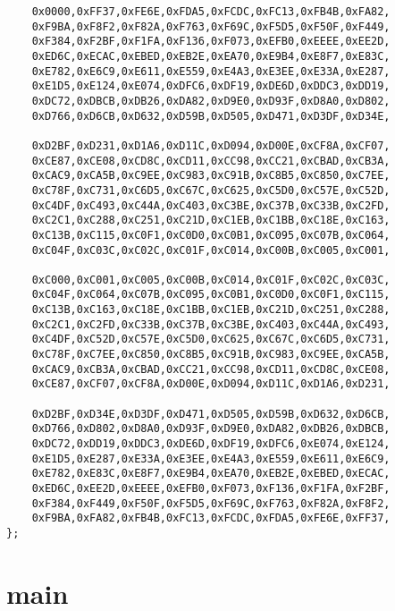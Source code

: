 \begin{lstlisting}
	0x0000,0xFF37,0xFE6E,0xFDA5,0xFCDC,0xFC13,0xFB4B,0xFA82,
	0xF9BA,0xF8F2,0xF82A,0xF763,0xF69C,0xF5D5,0xF50F,0xF449,
	0xF384,0xF2BF,0xF1FA,0xF136,0xF073,0xEFB0,0xEEEE,0xEE2D,
	0xED6C,0xECAC,0xEBED,0xEB2E,0xEA70,0xE9B4,0xE8F7,0xE83C,
	0xE782,0xE6C9,0xE611,0xE559,0xE4A3,0xE3EE,0xE33A,0xE287,
	0xE1D5,0xE124,0xE074,0xDFC6,0xDF19,0xDE6D,0xDDC3,0xDD19,
	0xDC72,0xDBCB,0xDB26,0xDA82,0xD9E0,0xD93F,0xD8A0,0xD802,
	0xD766,0xD6CB,0xD632,0xD59B,0xD505,0xD471,0xD3DF,0xD34E,

	0xD2BF,0xD231,0xD1A6,0xD11C,0xD094,0xD00E,0xCF8A,0xCF07,
	0xCE87,0xCE08,0xCD8C,0xCD11,0xCC98,0xCC21,0xCBAD,0xCB3A,
	0xCAC9,0xCA5B,0xC9EE,0xC983,0xC91B,0xC8B5,0xC850,0xC7EE,
	0xC78F,0xC731,0xC6D5,0xC67C,0xC625,0xC5D0,0xC57E,0xC52D,
	0xC4DF,0xC493,0xC44A,0xC403,0xC3BE,0xC37B,0xC33B,0xC2FD,
	0xC2C1,0xC288,0xC251,0xC21D,0xC1EB,0xC1BB,0xC18E,0xC163,
	0xC13B,0xC115,0xC0F1,0xC0D0,0xC0B1,0xC095,0xC07B,0xC064,
	0xC04F,0xC03C,0xC02C,0xC01F,0xC014,0xC00B,0xC005,0xC001,

	0xC000,0xC001,0xC005,0xC00B,0xC014,0xC01F,0xC02C,0xC03C,
	0xC04F,0xC064,0xC07B,0xC095,0xC0B1,0xC0D0,0xC0F1,0xC115,
	0xC13B,0xC163,0xC18E,0xC1BB,0xC1EB,0xC21D,0xC251,0xC288,
	0xC2C1,0xC2FD,0xC33B,0xC37B,0xC3BE,0xC403,0xC44A,0xC493,
	0xC4DF,0xC52D,0xC57E,0xC5D0,0xC625,0xC67C,0xC6D5,0xC731,
	0xC78F,0xC7EE,0xC850,0xC8B5,0xC91B,0xC983,0xC9EE,0xCA5B,
	0xCAC9,0xCB3A,0xCBAD,0xCC21,0xCC98,0xCD11,0xCD8C,0xCE08,
	0xCE87,0xCF07,0xCF8A,0xD00E,0xD094,0xD11C,0xD1A6,0xD231,

	0xD2BF,0xD34E,0xD3DF,0xD471,0xD505,0xD59B,0xD632,0xD6CB,
	0xD766,0xD802,0xD8A0,0xD93F,0xD9E0,0xDA82,0xDB26,0xDBCB,
	0xDC72,0xDD19,0xDDC3,0xDE6D,0xDF19,0xDFC6,0xE074,0xE124,
	0xE1D5,0xE287,0xE33A,0xE3EE,0xE4A3,0xE559,0xE611,0xE6C9,
	0xE782,0xE83C,0xE8F7,0xE9B4,0xEA70,0xEB2E,0xEBED,0xECAC,
	0xED6C,0xEE2D,0xEEEE,0xEFB0,0xF073,0xF136,0xF1FA,0xF2BF,
	0xF384,0xF449,0xF50F,0xF5D5,0xF69C,0xF763,0xF82A,0xF8F2,
	0xF9BA,0xFA82,0xFB4B,0xFC13,0xFCDC,0xFDA5,0xFE6E,0xFF37,
};
\end{lstlisting}


\section{main}
\label{main}

